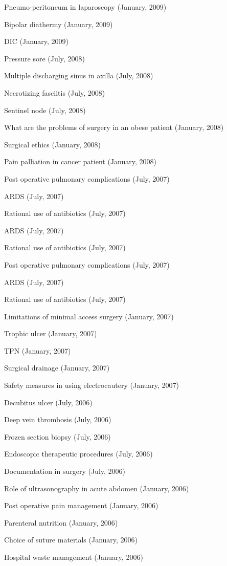 Pneumo-peritoneum in laparoscopy (January, 2009)


Bipolar diathermy (January, 2009)


DIC (January, 2009)


Pressure sore (July, 2008)


Multiple discharging sinus in axilla (July, 2008)


Necrotizing fasciitis (July, 2008)


Sentinel node (July, 2008)


What are the problems of surgery in an obese patient (January, 2008)


Surgical ethics (January, 2008)


Pain palliation in cancer patient (January, 2008)


Post operative pulmonary complications (July, 2007)


ARDS (July, 2007)


Rational use of antibiotics (July, 2007)


ARDS (July, 2007)


Rational use of antibiotics (July, 2007)


Post operative pulmonary complications (July, 2007)


ARDS (July, 2007)


Rational use of antibiotics (July, 2007)


Limitations of minimal access surgery (January, 2007)


Trophic ulcer (January, 2007)


TPN (January, 2007)


Surgical drainage (January, 2007)


Safety measures in using electrocautery (January, 2007)


Decubitus ulcer (July, 2006)


Deep vein thrombosis (July, 2006)


Frozen section biopsy (July, 2006)


Endoscopic therapeutic procedures (July, 2006)


Documentation in surgery (July, 2006)


Role of ultrasonography in acute abdomen (January, 2006)


Post operative pain management (January, 2006)


Parenteral nutrition (January, 2006)


Choice of suture materials (January, 2006)


Hospital waste management (January, 2006)



